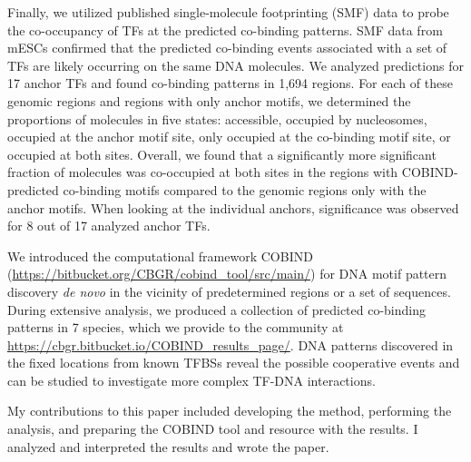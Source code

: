 Finally, we utilized published single-molecule footprinting (SMF) data to probe the co-occupancy of TFs at the predicted co-binding patterns. SMF data from \ac{mESCs} confirmed that the predicted co-binding events associated with a set of TFs are likely occurring on the same DNA molecules. We analyzed predictions for 17 anchor TFs and found co-binding patterns in 1,694 regions. For each of these genomic regions and regions with only anchor motifs, we determined the proportions of molecules in five states: accessible, occupied by nucleosomes, occupied at the anchor motif site, only occupied at the co-binding motif site, or occupied at both sites. Overall, we found that a significantly more significant fraction of molecules was co-occupied at both sites in the regions with COBIND-predicted co-binding motifs compared to the genomic regions only with the anchor motifs. When looking at the individual anchors, significance was observed for 8 out of 17 analyzed anchor TFs.

We introduced the computational framework COBIND (\url{https://bitbucket.org/CBGR/cobind_tool/src/main/}) for DNA motif pattern discovery \textit{de novo} in the vicinity of predetermined regions or a set of sequences. During extensive analysis, we produced a collection of predicted co-binding patterns in 7 species, which we provide to the community at \url{https://cbgr.bitbucket.io/COBIND_results_page/}. DNA patterns discovered in the fixed locations from known TFBSs reveal the possible cooperative events and can be studied to investigate more complex TF-DNA interactions.

My contributions to this paper included developing the method, performing the analysis, and preparing the COBIND tool and resource with the results. I analyzed and interpreted the results and wrote the paper.